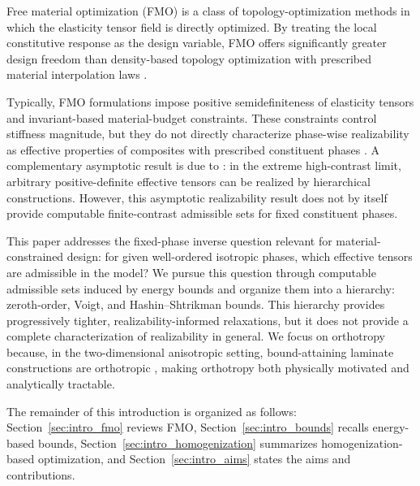 \documentclass[preprint,3p]{elsarticle}
\begin{document}
Free material optimization (FMO) is a class of topology-optimization methods in which the elasticity tensor field is directly optimized. By treating the local constitutive response as the design variable, FMO offers significantly greater design freedom than density-based topology optimization with prescribed material interpolation laws \citep{Ringertz1993,Bendsoe1994,Bendsoe1995,Zowe1997}.

Typically, FMO formulations impose positive semidefiniteness of elasticity tensors and invariant-based material-budget constraints. These constraints control stiffness magnitude, but they do not directly characterize phase-wise realizability as effective properties of composites with prescribed constituent phases \citep{Wu2021,Tyburec2022}. A complementary asymptotic result is due to \citet{Milton1995}: in the extreme high-contrast limit, arbitrary positive-definite effective tensors can be realized by hierarchical constructions. However, this asymptotic realizability result does not by itself provide computable finite-contrast admissible sets for fixed constituent phases.

This paper addresses the fixed-phase inverse question relevant for material-constrained design: for given well-ordered isotropic phases, which effective tensors are admissible in the model? We pursue this question through computable admissible sets induced by energy bounds and organize them into a hierarchy: zeroth-order, Voigt, and Hashin--Shtrikman bounds. This hierarchy provides progressively tighter, realizability-informed relaxations, but it does not provide a complete characterization of realizability in general. We focus on orthotropy because, in the two-dimensional anisotropic setting, bound-attaining laminate constructions are orthotropic \citep{Allaire1993wo,Allaire1993}, making orthotropy both physically motivated and analytically tractable.

The remainder of this introduction is organized as follows: Section~\ref{sec:intro_fmo} reviews FMO, Section~\ref{sec:intro_bounds} recalls energy-based bounds, Section~\ref{sec:intro_homogenization} summarizes homogenization-based optimization, and Section~\ref{sec:intro_aims} states the aims and contributions.
\end{document}

